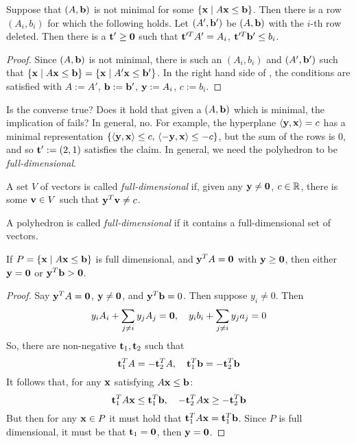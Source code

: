\begin{Prop}\label{ab_not_minimal}
	Suppose that $(A,\mathbf{b})$ is not minimal for some $\left\{\mathbf{x}\;|\; A\mathbf{x}\leq \mathbf{b}\right\}$.  Then there is a row $(A_i,b_i)$ for which the following holds.  Let $(A',\mathbf{b}')$ be $(A,\mathbf{b})$ with the $i$-th row deleted.  Then there is a $\mathbf{t}'\geq\mathbf{0}$ such that $\mathbf{t}'^T A' = A_i$, $\mathbf{t}'^T \mathbf{b}' \leq b_i$.
\end{Prop}

\begin{proof}
	Since $(A,\mathbf{b})$ is not minimal, there is such an $(A_i,b_i)$ and $(A',\mathbf{b}')$ such that $\left\{\mathbf{x}\;|\; A\mathbf{x}\leq \mathbf{b}\right\} = \left\{\mathbf{x}\;|\; A'\mathbf{x}\leq \mathbf{b}'\right\}$.  In the right hand side of , the conditions are satisfied with $A := A'$, $\mathbf{b} := \mathbf{b}'$, $\mathbf{y} := A_i$, $c := b_i$.
\end{proof}

Is the converse true?  Does it hold that given a $(A,\mathbf{b})$ which is minimal, the implication of  fails?  In general, no.  For example, the hyperplane $\left\langle \mathbf{y}, \mathbf{x} \right\rangle = c$ has a minimal representation $\left\{\left\langle \mathbf{y}, \mathbf{x} \right\rangle\leq c,\,\left\langle -\mathbf{y}, \mathbf{x} \right\rangle\leq -c\right\}$, but the sum of the rows is $0$, and so $\mathbf{t}':= (2,1)$ satisfies the claim.  In general, we need the polyhedron to be \textit{full-dimensional}.

\begin{Def}
	A set $V$ of vectors is called \textit{full-dimensional} if, given any $\mathbf{y}\neq\mathbf{0}$, $c\in\mathbb{R}$, there is some $\mathbf{v}\in V$ such that $\mathbf{y}^T\mathbf{v} \neq c$.
\end{Def}

\begin{Def}
	A polyhedron is called \textit{full-dimensional} if it contains a full-dimensional set of vectors.
\end{Def}

\drawNotFullDim

\begin{Prop}\label{ab_full_dim}
	If $P = \left\{\mathbf{x}\;|\; A\mathbf{x}\leq \mathbf{b}\right\}$ is full dimensional, and $\mathbf{y}^T A = \mathbf{0}$ with $\mathbf{y}\geq\mathbf{0}$, then either $\mathbf{y} = \mathbf{0}$ or $\mathbf{y}^T \mathbf{b} > \mathbf{0}$.
\end{Prop}

\begin{proof}
	Say $\mathbf{y}^T A = \mathbf{0}$, $\mathbf{y} \neq \mathbf{0}$, and $\mathbf{y}^T\mathbf{b} = 0$.  Then suppose $y_i \neq 0$.  Then
	\[y_i A_i + \sum_{j\neq i}y_j A_j = \mathbf{0},\quad y_i b_i + \sum_{j\neq i} y_j a_j = 0 \]
	So, there are non-negative $\mathbf{t}_1,\mathbf{t}_2$ such that
	\[\mathbf{t}_1^T A = -\mathbf{t}_2^T A,\quad \mathbf{t}_1^T\mathbf{b} = -\mathbf{t}_2^T\mathbf{b}\]
	It follows that, for any $\mathbf{x}$ satisfying $A\mathbf{x}\leq\mathbf{b}$:
  \[ \mathbf{t}_1^T A\mathbf{x} \leq \mathbf{t}_1^T \mathbf{b},\quad -\mathbf{t}_2^T A\mathbf{x} \geq -\mathbf{t}_2^T \mathbf{b} \]
  But then for any $\mathbf{x}\in P$ it must hold that $\mathbf{t}_1^T A \mathbf{x} = \mathbf{t}_1^T \mathbf{b}$.  Since $P$ is full dimensional, it must be that $\mathbf{t}_1 = \mathbf{0}$, then $\mathbf{y} = \mathbf{0}$.
\end{proof}

